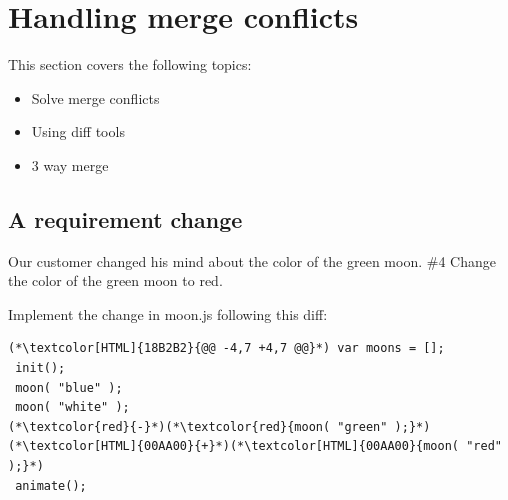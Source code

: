 \section{Handling merge conflicts}
\begin{frame}[fragile]
  \slidetitle
  This section covers the following topics:
  \begin{itemize}
    \pause
    \item Solve merge conflicts
    \pause
    \item Using diff tools
    \pause
    \item 3 way merge
  \end{itemize}
\end{frame}

\subsection{A requirement change}
\begin{frame}[fragile]
    \subslidetitle
  Our customer changed his mind about the color of the green moon.
  \newline \vspace{1em}
  \#4 Change the color of the green moon to red.

  Implement the change in moon.js following this diff:
\begin{lstlisting}
(*\textcolor[HTML]{18B2B2}{@@ -4,7 +4,7 @@}*) var moons = [];
 init();
 moon( "blue" );
 moon( "white" );
(*\textcolor{red}{-}*)(*\textcolor{red}{moon( "green" );}*)
(*\textcolor[HTML]{00AA00}{+}*)(*\textcolor[HTML]{00AA00}{moon( "red" );}*)
 animate();
\end{lstlisting}

\end{frame}

